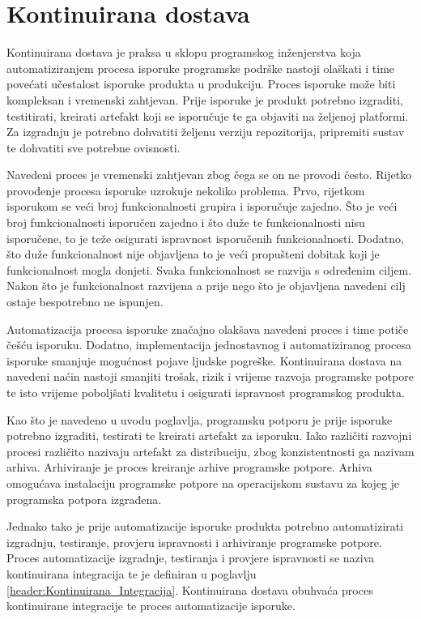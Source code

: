 \documentclass[times, utf8, diplomski, numeric]{fer}
\begin{document}
\chapter{Kontinuirana dostava} \label{header:KontinuiranaDostava}

Kontinuirana dostava je praksa u sklopu programskog inženjerstva koja automatiziranjem procesa isporuke programske podrške nastoji olaškati i time povećati učestalost isporuke produkta u produkciju. Proces isporuke može biti kompleksan i vremenski zahtjevan. Prije isporuke je produkt potrebno izgraditi, testitirati, kreirati artefakt koji se isporučuje te ga objaviti na željenoj platformi. Za izgradnju je potrebno dohvatiti željenu verziju repozitorija, pripremiti sustav te dohvatiti sve potrebne ovisnosti.

Navedeni proces je vremenski zahtjevan zbog čega se on ne provodi često. Rijetko provođenje procesa isporuke uzrokuje nekoliko problema. Prvo, rijetkom isporukom se veći broj funkcionalnosti grupira i isporučuje zajedno. Što je veći broj funkcionalnosti isporučen zajedno i što duže te funkcionalnosti nisu isporučene, to je teže osigurati ispravnost isporučenih funkcionalnosti. Dodatno, što duže funkcionalnost nije objavljena to je veći propušteni dobitak koji je funkcionalnost mogla donjeti. Svaka funkcionalnost se razvija s određenim ciljem. Nakon što je funkcionalnost razvijena a prije nego što je objavljena navedeni cilj ostaje bespotrebno ne ispunjen.

Automatizacija procesa isporuke značajno olakšava navedeni proces i time potiče češću isporuku. Dodatno, implementacija jednostavnog i automatiziranog procesa isporuke smanjuje mogućnost pojave ljudske pogreške. Kontinuirana dostava na navedeni naćin nastoji smanjiti trošak, rizik i vrijeme razvoja programske potpore te isto vrijeme poboljšati kvalitetu i osigurati ispravnost programskog produkta\citep{wiki:ContinuousDelivery}.

Kao što je navedeno u uvodu poglavlja, programsku potporu je prije isporuke potrebno izgraditi, testirati te kreirati artefakt za isporuku. Iako različiti razvojni procesi različito nazivaju artefakt za distribuciju, zbog konzistentnosti ga nazivam arhiva. Arhiviranje je proces kreiranje arhive programske potpore. Arhiva omogućava instalaciju programske potpore na operacijskom sustavu za kojeg je programska potpora izgrađena.

Jednako tako je prije automatizacije isporuke produkta potrebno automatizirati izgradnju, testiranje, provjeru ispravnosti i arhiviranje programske potpore. Proces automatizacije izgradnje, testiranja i provjere ispravnosti se naziva kontinuirana integracija te je definiran u poglavlju \ref{header:Kontinuirana_Integracija}. Kontinuirana dostava obuhvaća proces kontinuirane integracije te proces automatizacije isporuke.
\end{document}
